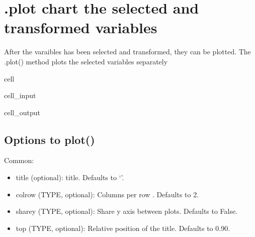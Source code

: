 \documentclass[letterpaper,10pt,english]{jupyterBook}
\begin{document}
\section{.plot chart the selected and transformed variables}
\label{\detokenize{content/Python/modelflow_features:plot-chart-the-selected-and-transformed-variables}}
\sphinxAtStartPar
After the varaibles has been selected and transformed, they can  be plotted. The .plot() method plots the selected variables separately

\begin{sphinxuseclass}{cell}\begin{sphinxVerbatimInput}

\begin{sphinxuseclass}{cell_input}
\begin{sphinxVerbatim}[commandchars=\\\{\}]

\PYG{p}{[}\PYG{p}{]}
\end{sphinxVerbatim}

\end{sphinxuseclass}\end{sphinxVerbatimInput}
\begin{sphinxVerbatimOutput}

\begin{sphinxuseclass}{cell_output}
\noindent{}

\end{sphinxuseclass}\end{sphinxVerbatimOutput}

\end{sphinxuseclass}

\subsection{Options to plot()}
\label{\detokenize{content/Python/modelflow_features:options-to-plot}}
\sphinxAtStartPar
Common:
\begin{itemize}
\item {} 
\sphinxAtStartPar
title (optional): title. Defaults to ‘’.

\item {} 
\sphinxAtStartPar
colrow (TYPE, optional): Columns per row . Defaults to 2.

\item {} 
\sphinxAtStartPar
sharey (TYPE, optional): Share y axis between plots. Defaults to False.

\item {} 
\sphinxAtStartPar
top (TYPE, optional): Relative position of the title. Defaults to 0.90.

\end{itemize}
\end{document}
